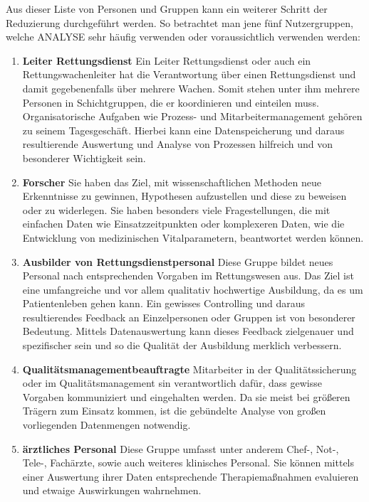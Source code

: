 Aus dieser Liste von Personen und Gruppen kann ein weiterer Schritt der Reduzierung durchgeführt werden. 
So betrachtet man jene fünf Nutzergruppen, welche \gls{ANALYSE} sehr häufig verwenden oder voraussichtlich verwenden werden:
\begin{enumerate}
\item \textbf{Leiter Rettungsdienst} Ein Leiter Rettungsdienst oder auch ein Rettungswachenleiter hat die Verantwortung über einen Rettungsdienst und damit gegebenenfalls über mehrere Wachen.
Somit stehen unter ihm mehrere Personen in Schichtgruppen, die er koordinieren und einteilen muss.
Organisatorische Aufgaben wie Prozess- und Mitarbeitermanagement gehören zu seinem Tagesgeschäft.
Hierbei kann eine Datenspeicherung und daraus resultierende Auswertung und Analyse von Prozessen hilfreich und von besonderer Wichtigkeit sein.
\item \textbf{Forscher} Sie haben das Ziel, mit wissenschaftlichen Methoden neue Erkenntnisse zu gewinnen, Hypothesen aufzustellen und diese zu beweisen oder zu widerlegen.
Sie haben besonders viele Fragestellungen, die mit einfachen Daten wie Einsatzzeitpunkten oder komplexeren Daten, wie  die Entwicklung von medizinischen Vitalparametern, beantwortet werden können.
\item \textbf{Ausbilder von Rettungsdienstpersonal} Diese Gruppe bildet neues Personal nach entsprechenden Vorgaben im Rettungswesen aus.
Das Ziel ist eine umfangreiche und vor allem qualitativ hochwertige Ausbildung, da es um Patientenleben gehen kann.
Ein gewisses Controlling und daraus resultierendes Feedback an Einzelpersonen oder Gruppen ist von besonderer Bedeutung.
Mittels Datenauswertung kann dieses Feedback zielgenauer und spezifischer sein und so die Qualität der Ausbildung merklich verbessern.
\item \textbf{Qualitätsmanagementbeauftragte} Mitarbeiter in der Qualitätssicherung oder im Qualitätsmanagement sin verantwortlich dafür, dass gewisse Vorgaben kommuniziert und eingehalten werden.
Da sie meist bei größeren Trägern zum Einsatz kommen, ist die gebündelte Analyse von großen vorliegenden Datenmengen notwendig.
\item \textbf{ärztliches Personal} Diese Gruppe umfasst unter anderem Chef-, Not-, Tele-, Fachärzte, sowie auch weiteres klinisches Personal.
Sie können mittels einer Auswertung ihrer Daten entsprechende Therapiemaßnahmen evaluieren und etwaige Auswirkungen wahrnehmen.
\end{enumerate}


